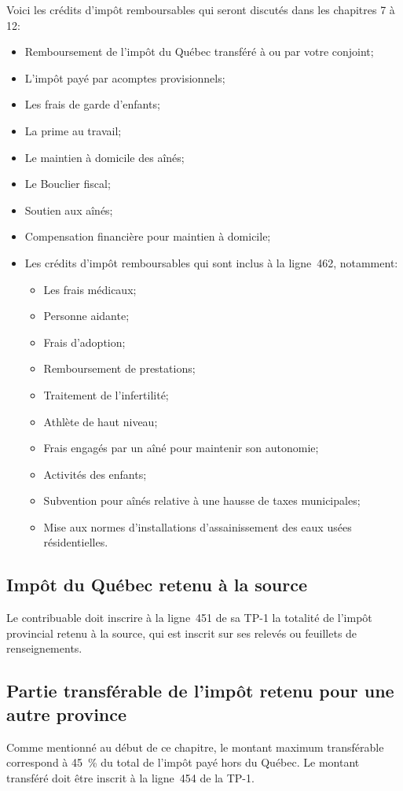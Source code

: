 Voici les crédits d'impôt remboursables qui seront discutés dans les chapitres 7 à 12:
\begin{itemize}
	\item Remboursement de l'impôt du Québec transféré à ou par votre conjoint;
	\item L'impôt payé par acomptes provisionnels;
	\item Les frais de garde d'enfants;
	\item La prime au travail;
	\item Le maintien à domicile des aînés;
	\item Le Bouclier fiscal;
	\item Soutien aux aînés;
	\item Compensation financière pour maintien à domicile;
	\item Les crédits d'impôt remboursables qui sont inclus à la ligne~462, notamment:
	\begin{itemize}
		\item Les frais médicaux;
		\item Personne aidante;
		\item Frais d'adoption;
		\item Remboursement de prestations;
		\item Traitement de l'infertilité;
		\item Athlète de haut niveau;
		\item Frais engagés par un aîné pour maintenir son autonomie;
		\item Activités des enfants;
		\item Subvention pour aînés relative à une hausse de taxes municipales;
		\item Mise aux normes d'installations d'assainissement des eaux usées résidentielles.
	\end{itemize}
\end{itemize}

\subsection{Impôt du Québec retenu à la source}
Le contribuable doit inscrire à la ligne~451 de sa TP-1 la totalité de l'impôt provincial retenu à la source, qui est inscrit sur ses relevés ou feuillets de renseignements. 

\subsection{Partie transférable de l'impôt retenu pour une autre province}
Comme mentionné au début de ce chapitre, le montant maximum transférable correspond à 45~\% du total de l'impôt payé hors du Québec. Le montant transféré doit être inscrit à la ligne~454 de la TP-1. 

